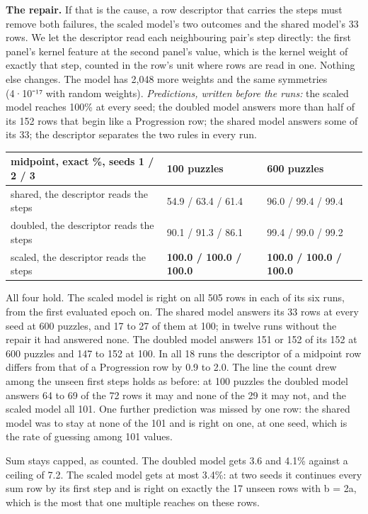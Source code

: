 \textbf{The repair.} If that is the cause, a row descriptor that carries the steps must remove both failures, the scaled model's two outcomes and the shared model's 33 rows. We let the descriptor read each neighbouring pair's step directly: the first panel's kernel feature at the second panel's value, which is the kernel weight of exactly that step, counted in the row's unit where rows are read in one. Nothing else changes. The model has 2,048 more weights and the same symmetries (4·10⁻¹⁷ with random weights). \emph{Predictions, written before the runs:} the scaled model reaches 100\% at every seed; the doubled model answers more than half of its 152 rows that begin like a Progression row; the shared model answers some of its 33; the descriptor separates the two rules in every run.

\begin{center}\small
\begin{tabularx}{\linewidth}{@{}YYY@{}}
\toprule
midpoint, exact \%, seeds 1 / 2 / 3 & 100 puzzles & 600 puzzles \\
\midrule
shared, the descriptor reads the steps & 54.9 / 63.4 / 61.4 & 96.0 / 99.4 / 99.4 \\
doubled, the descriptor reads the steps & 90.1 / 91.3 / 86.1 & 99.4 / 99.0 / 99.2 \\
scaled, the descriptor reads the steps & \textbf{100.0 / 100.0 / 100.0} & \textbf{100.0 / 100.0 / 100.0} \\
\bottomrule
\end{tabularx}
\end{center}

All four hold. The scaled model is right on all 505 rows in each of its six runs, from the first evaluated epoch on. The shared model answers its 33 rows at every seed at 600 puzzles, and 17 to 27 of them at 100; in twelve runs without the repair it had answered none. The doubled model answers 151 or 152 of its 152 at 600 puzzles and 147 to 152 at 100. In all 18 runs the descriptor of a midpoint row differs from that of a Progression row by 0.9 to 2.0. The line the count drew among the unseen first steps holds as before: at 100 puzzles the doubled model answers 64 to 69 of the 72 rows it may and none of the 29 it may not, and the scaled model all 101. One further prediction was missed by one row: the shared model was to stay at none of the 101 and is right on one, at one seed, which is the rate of guessing among 101 values.

Sum stays capped, as counted. The doubled model gets 3.6 and 4.1\% against a ceiling of 7.2. The scaled model gets at most 3.4\%: at two seeds it continues every sum row by its first step and is right on exactly the 17 unseen rows with b = 2a, which is the most that one multiple reaches on these rows.

